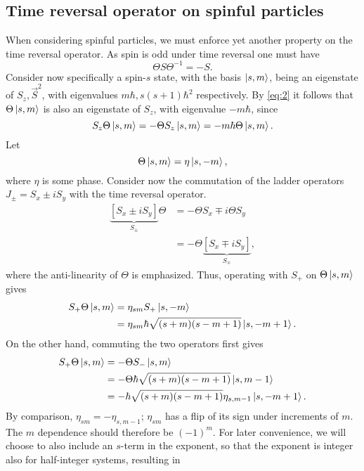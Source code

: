 \subsection{Time reversal operator on spinful particles}
When considering spinful particles, we must enforce yet another property on the time reversal operator.
As spin is odd under time reversal one must have
\begin{equation}
  \label{eq:2}
  \Theta S \Theta^{-1} = -S.
\end{equation}
Consider now specifically a spin-$s$ state, with the basis $\ket{s, m}$, being an eigenstate of $S_z, \vec{S}^2$, with eigenvalues $m\hbar, s(s+1) \hbar^2$ respectively.
By \cref{eq:2} it follows that $\Theta \ket{s, m}$ is also an  eigenstate of $S_z$, with eigenvalue $-m \hbar $, since
\begin{equation}
  S_z \Theta \ket{s, m} = -\Theta  S_z \ket{s, m} = -m \hbar \Theta \ket{s, m}.
\end{equation}
Let
\[
  \Theta \ket{s, m} = \eta \ket{s, -m},
\]
where $\eta $ is some phase.
Consider now the commutation of the ladder operators $J_{\pm} = S_x \pm i S_y$ with the time reversal operator.
\begin{equation}
  \begin{split}
    \underbrace{\left[ S_x \pm i S_y \right]}_{S_{\pm}} \Theta  &= -\Theta S_x \mp i \Theta S_y\\
    &= -\Theta \underbrace{\left[ S_x \mp iS_y \right]}_{S_{\mp}},
  \end{split}
\end{equation}
where the anti-linearity of $\Theta $ is emphasized.
Thus, operating with $S_+$ on $\Theta \ket{s, m}$ gives
\begin{align}
  S_+ \Theta \ket{s, m} &= \eta_{sm} S_+ \ket{s, -m}\\
  &= \eta_{sm} \hbar \sqrt{(s+m) (s-m+1)} \ket{s, -m +  1}.
\end{align}
On the other hand, commuting the two operators first gives
\begin{align}
  S_+ \Theta  \ket{s, m} &= - \Theta  S_- \ket{s, m}\\
                         &= - \Theta \hbar \sqrt{(s+m)(s-m+1)} \ket{s, m-1}\\
  &= -\hbar \sqrt{(s+m)(s-m+1)} \eta_{s, m-1} \ket{s, -m + 1}.
\end{align}
By comparison, $\eta _{sm}= - \eta _{s, m-1}$; $\eta _{sm}$ has a flip of its sign under increments of $m$.
The $m$ dependence should therefore be $(-1)^m$.
For later convenience, we will choose to also include an $s$-term in the exponent, so that the exponent is integer also for half-integer systems, resulting in
